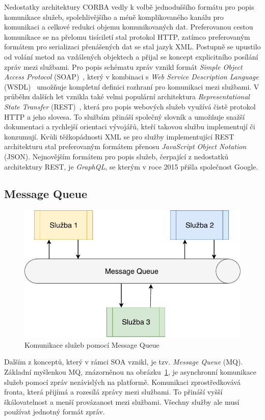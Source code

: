 Nedostatky architektury \gls{CORBA} vedly k volbě jednoduššího
formátu pro popis komunikace služeb, spolehlivějšího a méně
komplikovaného kanálu pro komunikaci a celkové redukci
objemu komunikovaných dat. Preferovanou cestou komunikace
se na přelomu tisíciletí stal protokol \gls{HTTP}, zatímco preferovaným formátem
pro serializaci přenášených dat se stal jazyk \gls{XML}.
Postupně se upustilo od volání metod na vzdálených objektech a přijal
se koncept explicitního posílání zpráv mezi službami.
Pro popis schématu zpráv vznikl formát \textit{Simple Object Access
Protocol} (\gls{SOAP})~\cite{box2000simple}, který v kombinaci s
\textit{Web Service Description Language} (\gls{WSDL})~\cite{christensen2001web}
umožňuje kompletní definici rozhraní pro komunikaci mezi službami.
V průběhu dalších let vznikla také velmi populární architektura
\textit{Representational State Transfer} (\gls{REST})~\cite{fielding2000rest},
která pro popis webových služeb využívá čistě protokol \gls{HTTP} a jeho slovesa.
To službám přináší společný slovník a umožňuje snažší dokumentaci
a rychlejší orientaci vývojářů, kteří takovou službu implementují či konzumují.
Kvůli těžkopádnosti \gls{XML} se pro služby implementující \gls{REST} architekturu stal
preferovaným formátem přenosu \textit{JavaScript Object Notation} (\gls{JSON}).
Nejnovějším formátem pro popis služeb, čerpající z nedostatků architektury \gls{REST}, je
\textit{GraphQL}, se kterým v roce 2015 přišla společnost Google.

\subsection{Message Queue}

\begin{figure}
    \centering
    \includegraphics[keepaspectratio=true, width=0.5\linewidth]{figures/message-queue.pdf}
    \caption{Komunikace služeb pomocí Message Queue}
    \label{fig:message-queue}
\end{figure}

Dalším z konceptů, který v rámci \gls{SOA} vznikl, je tzv. \textit{Message Queue} (\gls{MQ}).
Základní myšlenkou \gls{MQ}, znázorněnou na obrázku~\ref{fig:message-queue},
je asynchronní komunikace služeb pomocí zpráv nezávislých
na platformě. Komunikaci zprostředkovává fronta, která přijímá a rozesílá
zprávy mezi službami. To přináší vyšší škálovatelnost a menší provázanost
mezi službami. Všechny služby ale musí používat jednotný formát zpráv.

